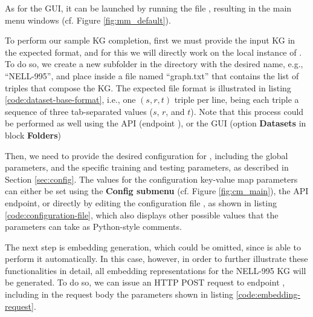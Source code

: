 As for the GUI, it can be launched by running the file , resulting in the main menu windows (cf. Figure \ref{fig:mm_default}).


To perform our sample KG completion, first we must provide the input KG in the expected format, and for this we will directly work on the local instance of \toolname{}. To do so, we create a new subfolder in the  directory with the desired name,  e.g., ``NELL-995'', and place inside a file named ``graph.txt'' that contains the list of triples that compose the KG. The expected file format is illustrated in listing \ref{code:dataset-base-format}, i.e., one $(s,r,t)$ triple per line, being each triple a sequence of three tab-separated values ($s$, $r$, and $t$). Note that this process could be performed as well using the API (endpoint ), or the GUI (option \textbf{Datasets} in block \textbf{Folders})



Then, we need to provide the desired configuration for \toolname{}, including the global parameters, and the specific training and testing parameters, as described in Section \ref{sec:config}. The values for the configuration key-value map parameters can either be set using the \textbf{Config submenu} (cf. Figure \ref{fig:cm_main}), the  API endpoint, or directly by editing the configuration file , as shown in listing \ref{code:configuration-file}, which also displays other possible values that the parameters can take as Python-style comments.



The next step is embedding generation, which could be omitted, since \toolname{} is able to perform it automatically. In this case, however, in order to further illustrate these functionalities in detail, all embedding representations for the NELL-995 KG will be generated. To do so, we can issue an HTTP POST request to endpoint , including in the request body the parameters shown in listing \ref{code:embedding-request}.

